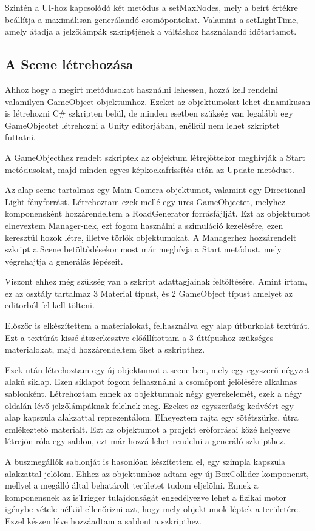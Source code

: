 Szintén a UI-hoz kapcsolódó két metódus a setMaxNodes, mely a beírt értékre beállítja a maximálisan generálandó csomópontokat. Valamint a setLightTime, amely átadja a jelzőlámpák szkriptjének a váltáshoz használandó időtartamot.
\subsection{A Scene létrehozása}
Ahhoz hogy a megírt metódusokat használni lehessen, hozzá kell rendelni valamilyen GameObject objektumhoz. Ezeket az objektumokat lehet dinamikusan is létrehozni C\# szkripten belül, de minden esetben szükség van legalább egy GameObjectet létrehozni a Unity editorjában, enélkül nem lehet szkriptet futtatni.

A GameObjecthez rendelt szkriptek az objektum létrejöttekor meghívják a Start metódusokat, majd minden egyes képkockafrissítés után az Update metódust.

Az alap scene tartalmaz egy Main Camera objektumot, valamint egy Directional Light fényforrást. Létrehoztam ezek mellé egy üres GameObjectet, melyhez komponensként hozzárendeltem a RoadGenerator forrásfájlját. Ezt az objektumot elneveztem Manager-nek, ezt fogom használni a szimuláció kezelésére, ezen keresztül hozok létre, illetve törlök objektumokat. A Managerhez hozzárendelt szkript a Scene betöltődésekor most már meghívja a Start metódust, mely végrehajtja a generálás lépéseit.

Viszont ehhez még szükség van a szkript adattagjainak feltöltésére. Amint írtam, ez az osztály tartalmaz 3 Material típust, és 2 GameObject típust amelyet az editorból fel kell tölteni. 

Először is elkészítettem a materialokat, felhasználva egy alap útburkolat textúrát. Ezt a textúrát kissé átszerkesztve előállítottam a 3 úttípushoz szükséges materialokat, majd hozzárendeltem őket a szkripthez.

Ezek után létrehoztam egy új objektumot a scene-ben, mely egy egyszerű négyzet alakú síklap. Ezen síklapot fogom felhasználni a csomópont jelölésére alkalmas sablonként. Létrehoztam ennek az objektumnak négy gyerekelemét, ezek a négy oldalán lévő jelzőlámpáknak felelnek meg. Ezeket az egyszerűség kedvéért egy alap kapszula alakzattal reprezentálom. Elheyeztem rajta egy sötétszürke, útra emlékeztető materialt. Ezt az objektumot a projekt erőforrásai közé helyezve létrejön róla egy sablon, ezt már hozzá lehet rendelni a generáló szkripthez.

A buszmegállók sablonját is hasonlóan készítettem el, egy szimpla kapszula alakzattal jelölöm. Ehhez az objektumhoz adtam egy új BoxCollider komponenst, mellyel a megálló által behatárolt területet tudom eljelölni. Ennek a komponensnek az isTrigger tulajdonságát engedélyezve lehet a fizikai motor igénybe vétele nélkül ellenőrizni azt, hogy mely objektumok léptek a területére. Ezzel készen léve hozzáadtam a sablont a szkripthez.

